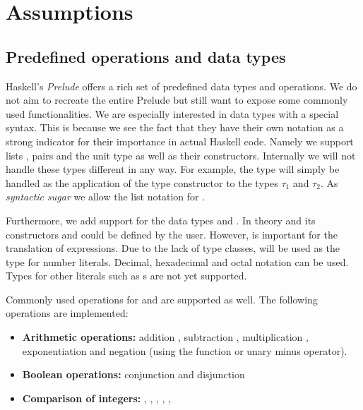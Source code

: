 \section{Assumptions} \label{sec:translation:assumtions}
\subsection{Predefined operations and data types}
Haskell's \textit{Prelude} offers a rich set of predefined data types and operations.
We do not aim to recreate the entire Prelude but still want to expose some commonly used functionalities.
We are especially interested in data types with a special syntax.
This is because we see the fact that they have their own notation as a strong indicator for their importance in actual Haskell code.
Namely we support lists \haskell{[a]}, pairs  and the unit type \haskell{()} as well as their constructors.
Internally we will not handle these types different in any way.
For example, the type  will simply be handled as the application of the type constructor \haskell{(,)} to the types $\tau_1$ and $\tau_2$.
As \textit{syntactic sugar} we allow the list notation \haskell{[@$e_1$@, @$\ldots$@, @$e_n$@]} for .

Furthermore, we add support for the data types  and .
In theory  and its constructors  and  could be defined by the user.
However,  is important for the translation of  expressions.
Due to the lack of type classes,  will be used as the type for number literals.
Decimal, hexadecimal and octal notation can be used.
Types for other literals such as s are not yet supported.

Commonly used operations for  and  are supported as well.
The following operations are implemented:
\begin{itemize}
  \item \textbf{Arithmetic operations:} addition \haskell{(+)}, subtraction \haskell{(-)}, multiplication \haskell{(*)}, exponentiation \haskell{(^)} and negation (using the  function or unary minus operator).
  \item \textbf{Boolean operations:} conjunction \haskell{(&&)} and disjunction \haskell{(||)}
  \item \textbf{Comparison of integers:} \haskell{(<=)}, \haskell{(<)}, \haskell{(==)}, \haskell{(/=)}, \haskell{(>=)}, \haskell{(>)}
\end{itemize}
